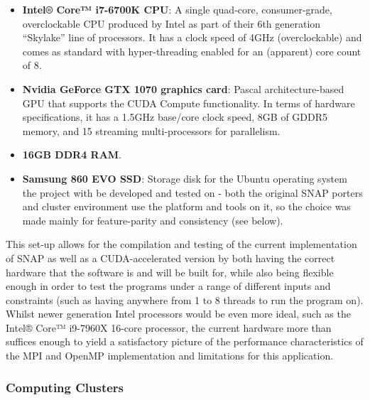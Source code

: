 \documentclass[conference]{IEEEtran}
\begin{document}
\begin{itemize}
    \item \textbf{Intel® Core™ i7-6700K CPU}: A single quad-core, consumer-grade, overclockable CPU produced by Intel as part of their 6th generation ``Skylake'' line of processors. It has a clock speed of 4GHz (overclockable) and comes as standard with hyper-threading enabled for an (apparent) core count of 8.
    \item \textbf{Nvidia GeForce GTX 1070 graphics card}: Pascal architecture-based GPU that supports the CUDA Compute functionality. In terms of hardware specifications, it has a 1.5GHz base/core clock speed, 8GB of GDDR5 memory, and 15 streaming multi-processors for parallelism.
    \item \textbf{16GB DDR4 RAM}.
    \item \textbf{Samsung 860 EVO SSD}: Storage disk for the Ubuntu operating system the project with be developed and tested on - both the original SNAP porters and cluster environment use the platform and tools on it, so the choice was made mainly for feature-parity and consistency (see below).
\end{itemize}

This set-up allows for the compilation and testing of the current implementation of SNAP as well as a CUDA-accelerated version by both having the correct hardware that the software is and will be built for, while also being flexible enough in order to test the programs under a range of different inputs and constraints (such as having anywhere from 1 to 8 threads to run the program on). Whilst newer generation Intel processors would be even more ideal, such as the Intel® Core™ i9-7960X 16-core processor, the current hardware more than suffices enough to yield a satisfactory picture of the performance characteristics of the MPI and OpenMP implementation and limitations for this application.

\subsubsection{Computing Clusters}
\label{subsubsec:clusters}

\end{document}
